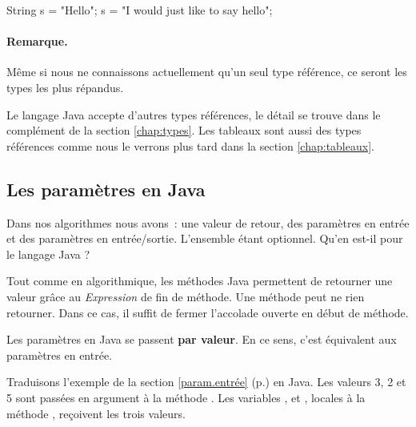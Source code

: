 	\begin{java}
		String s = "Hello";
		s = "I would just like to say hello";
	\end{java}
		
	\begin{center}
	\end{center}
	
	\paragraph{Remarque.} Même si nous ne connaissons actuellement qu'un seul
	type référence, ce seront les types les plus répandus. 
	
	
	Le langage Java accepte d'autres types références, le détail se trouve dans
	le complément de la section \vref{chap:types}. Les tableaux sont aussi des
	types références comme nous le verrons plus tard dans la section
	\vref{chap:tableaux}.
	
	
	
	\subsection{Les paramètres en Java}

	Dans nos algorithmes nous avons~: une valeur de retour, des paramètres en
	entrée et des paramètres en entrée/sortie. L'ensemble étant optionnel. Qu'en
	est-il pour le langage Java ? 

	Tout comme en algorithmique, les méthodes Java permettent de retourner une
	valeur grâce au  \textit{Expression} de fin de méthode. Une
	méthode peut ne rien retourner. Dans ce cas, il suffit de fermer l'accolade
	ouverte en début de méthode.

	Les paramètres en Java se passent \textbf{par valeur}. En ce sens, c'est
	équivalent aux paramètres en entrée. 

	Traduisons l'exemple de la section \ref{param.entrée}
	(p.\pageref{param.entrée}) en Java. Les valeurs 3, 2 et 5 sont passées en
	argument à la méthode . Les variables ,  et ,
	locales à la méthode , reçoivent les trois valeurs. 

